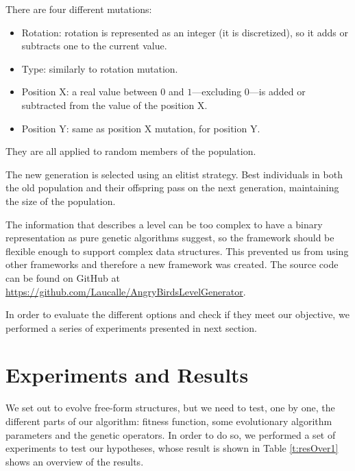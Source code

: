\documentclass[a4paper,twoside]{article}
\begin{document}
There are four different mutations:

\begin{itemize}
	\item Rotation: rotation is represented as an integer (it is discretized), 
	so it adds or 
	subtracts one 
	to the current value. %
	\item Type: similarly to rotation mutation.
	\item Position X: a real value between $0$ and $1$---excluding $0$---is 
	added or subtracted from the value of the position X.
	\item Position Y: same as position X mutation, for position Y.
\end{itemize}

They are all applied to random members of the population.

The new generation is selected using an elitist strategy. Best individuals in 
both the old population and their offspring pass on the next generation, 
maintaining the size of the population.

The information that describes a level can be too complex to have a binary 
representation as pure genetic algorithms suggest, so the framework should be 
flexible enough to support complex data structures. This prevented us from using other 
frameworks
and therefore a new framework was created. The source  code can be
found on GitHub at \url{https://github.com/Laucalle/AngryBirdsLevelGenerator}. %

In order to evaluate the different options and check if they meet our
objective, we performed a series of experiments presented in next
section. 

\section{Experiments and Results}\label{ch:res}

We set out to evolve free-form structures, but we need to test, one by
one, the different parts of our algorithm: fitness function, some
evolutionary algorithm parameters and the genetic operators. In order
to do so, we performed a set of experiments to test our hypotheses,
whose result is shown in Table \ref{t:resOver1} shows an overview of the results. 
\end{document}

